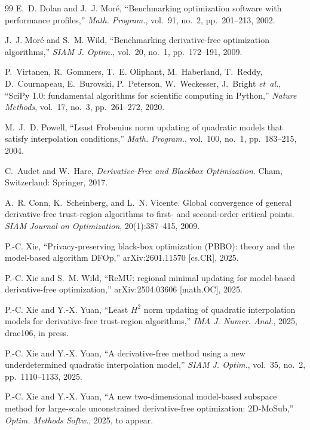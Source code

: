\documentclass[11pt,a4paper]{article}
\begin{document}
\begin{thebibliography}{99}
 E.~D. Dolan and J.~J. Mor\'e,
 ``Benchmarking optimization software with performance profiles,''
 \emph{Math. Program.}, vol.~91, no.~2, pp.~201--213, 2002.

 J.~J. Mor\'e and S.~M. Wild,
 ``Benchmarking derivative-free optimization algorithms,''
 \emph{SIAM J. Optim.}, vol.~20, no.~1, pp.~172--191, 2009.

 P.~Virtanen, R.~Gommers, T.~E. Oliphant, M.~Haberland, T.~Reddy, D.~Cournapeau,
 E.~Burovski, P.~Peterson, W.~Weckesser, J.~Bright \emph{et~al.},
 ``SciPy 1.0: fundamental algorithms for scientific computing in Python,''
 \emph{Nature Methods}, vol.~17, no.~3, pp.~261--272, 2020.

M.~J.~D. Powell, ``Least Frobenius norm updating of quadratic
models that satisfy interpolation conditions,''
\emph{Math. Program.}, vol.~100, no.~1, pp.~183--215, 2004.

C.~Audet and W.~Hare,
\emph{Derivative-Free and Blackbox Optimization}.
Cham, Switzerland: Springer, 2017.

A.~R. Conn, K.~Scheinberg, and L.~N. Vicente.
\newblock Global convergence of general derivative-free
  trust-region algorithms to first- and second-order critical
  points.
\newblock \emph{SIAM Journal on Optimization}, 20(1):387--415,
  2009.

P.-C. Xie, ``Privacy-preserving black-box optimization (PBBO):
theory and the model-based algorithm DFOp,'' arXiv:2601.11570
[cs.CR], 2025.

P.-C. Xie and S.~M. Wild, ``ReMU: regional minimal updating for
model-based derivative-free optimization,'' arXiv:2504.03606
[math.OC], 2025.

P.-C. Xie and Y.-X. Yuan, ``Least $H^2$ norm updating of quadratic
interpolation models for derivative-free trust-region algorithms,''
\emph{IMA J. Numer. Anal.}, 2025, drae106, in press.

P.-C. Xie and Y.-X. Yuan, ``A derivative-free method using a new
underdetermined quadratic interpolation model,'' \emph{SIAM J.
Optim.}, vol.~35, no.~2, pp.~1110--1133, 2025.

P.-C. Xie and Y.-X. Yuan, ``A new two-dimensional model-based
subspace method for large-scale unconstrained derivative-free
optimization: 2D-MoSub,'' \emph{Optim. Methods Softw.}, 2025, to
appear.


\end{thebibliography}
\end{document}
